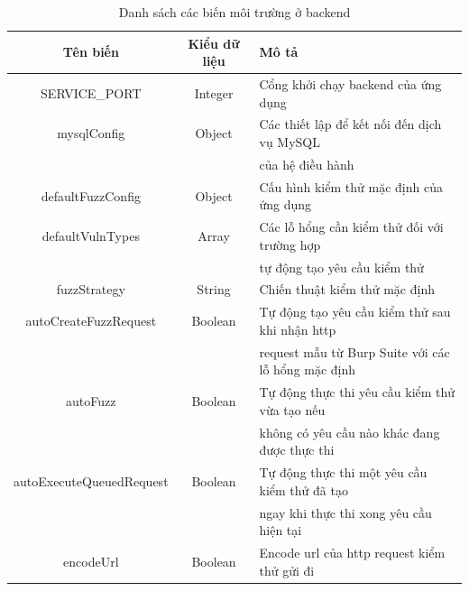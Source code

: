 \FloatBarrier
\begin{table}[ht]
    \centering
    \caption{Danh sách các biến môi trường ở backend}
    \label{tab:env-variables-backend}
    \begin{tabular}[ht]{ccl}
        \toprule[1pt]\midrule[0.3pt]
            \textbf{Tên biến}&\textbf{Kiểu dữ liệu}&\textbf{Mô tả}\\ 
        \midrule
            SERVICE\_PORT&Integer&Cổng khởi chạy backend của ứng dụng\\
            \addlinespace
            mysqlConfig&Object&Các thiết lập để kết nối đến dịch vụ MySQL\\
            {}&{}&của hệ điều hành\\
            \addlinespace
            defaultFuzzConfig&Object&Cấu hình kiểm thử mặc định của ứng dụng\\
            \addlinespace
            defaultVulnTypes&Array&Các lỗ hổng cần kiểm thử đối với trường hợp\\
            {}&{}&tự động tạo yêu cầu kiểm thử\\
            \addlinespace
            fuzzStrategy&String&Chiến thuật kiểm thử mặc định\\
            \addlinespace
            autoCreateFuzzRequest&Boolean&Tự động tạo yêu cầu kiểm thử sau khi nhận \acrshort{http}\\
            {}&{}&request mẫu từ Burp Suite với các lỗ hổng mặc định\\
            \addlinespace
            autoFuzz&Boolean&Tự động thực thi yêu cầu kiểm thử vừa tạo nếu\\
            {}&{}&không có yêu cầu nào khác đang được thực thi\\
            \addlinespace
            autoExecuteQueuedRequest&Boolean&Tự động thực thi một yêu cầu kiểm thử đã tạo\\
            {}&{}&ngay khi thực thi xong yêu cầu hiện tại\\
            \addlinespace
            encodeUrl&Boolean&Encode \acrshort{url} của \acrshort{http} request kiểm thử gửi đi\\
        \midrule[0.3pt]\bottomrule[1pt]
    \end{tabular}
\end{table}
